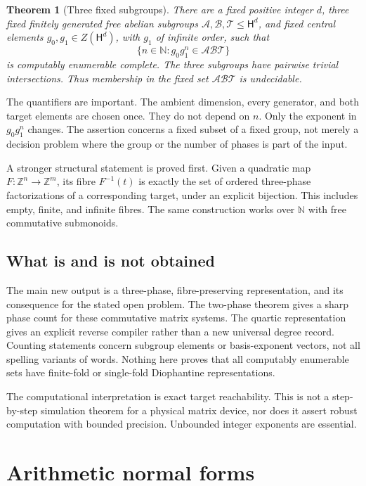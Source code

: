 \documentclass[11pt,letterpaper]{article}
\newtheorem{theorem}{Theorem}[section]
\theoremstyle{definition}
\theoremstyle{remark}
\newcommand{\ZZ}{\mathbb Z}
\newcommand{\NN}{\mathbb N}
\newcommand{\HH}{\mathsf H}
\newcommand{\calA}{\mathcal A}
\newcommand{\calB}{\mathcal B}
\newcommand{\calT}{\mathcal T}
\begin{document}
\begin{theorem}[Three fixed subgroups]\label{gts:tp:thm:main}
There are a fixed positive integer $d$, three fixed finitely generated free
abelian subgroups $\calA,\calB,\calT\leq\HH^d$, and fixed central elements
$g_0,g_1\in Z(\HH^d)$, with $g_1$ of infinite order, such that
\[
 \{n\in\NN:g_0g_1^n\in\calA\calB\calT\}
\]
is computably enumerable complete. The three subgroups have pairwise trivial
intersections. Thus membership in the fixed set $\calA\calB\calT$ is
undecidable.
\end{theorem}

The quantifiers are important. The ambient dimension, every generator, and
both target elements are chosen once. They do not depend on $n$. Only the
exponent in $g_0g_1^n$ changes. The assertion concerns a fixed subset of a
fixed group, not merely a decision problem where the group or the number of
phases is part of the input.

A stronger structural statement is proved first. Given a quadratic map
$F:\ZZ^n\to\ZZ^m$, its fibre $F^{-1}(t)$ is exactly the set of ordered
three-phase factorizations of a corresponding target, under an explicit
bijection. This includes empty, finite, and infinite fibres. The same
construction works over $\NN$ with free commutative submonoids.

\subsection{What is and is not obtained}
The main new output is a three-phase, fibre-preserving representation, and
its consequence for the stated open problem. The two-phase theorem gives a
sharp phase count for these commutative matrix systems. The quartic
representation gives an explicit reverse compiler rather than a new
universal degree record. Counting statements concern subgroup elements or
basis-exponent vectors, not all spelling variants of words. Nothing here
proves that all computably enumerable sets have finite-fold or single-fold
Diophantine representations.

The computational interpretation is exact target reachability. This is not
a step-by-step simulation theorem for a physical matrix device, nor does it
assert robust computation with bounded precision. Unbounded integer
exponents are essential.

\section{Arithmetic normal forms}
\label{gts:tp:sec:normal}
\end{document}
